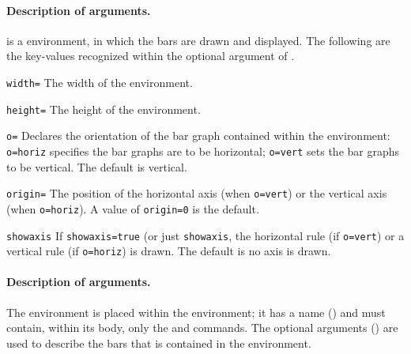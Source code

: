 \documentclass{article}
\begin{document}

\paragraph*{Description of \protect{} arguments.}  is
a  environment, in which the bars are drawn and
displayed. The following are the key-values recognized within the optional
argument of .
\begin{aebDescript}
  \item[\texttt{width=\ameta{length}}] The width of the environment.
  \item[\texttt{height=\ameta{length}}] The height of the environment.
  \item[\texttt{o=\ameta{\upshape{horiz|vert}}}] Declares the orientation of
      the bar graph contained within the environment: \texttt{o=horiz}
      specifies the bar graphs are to be horizontal; \texttt{o=vert} sets the
      bar graphs to be vertical. The default is vertical.
  \item[\texttt{origin=\ameta{\upshape{0|.5}}}] The position of
      the horizontal axis (when \texttt{o=vert}) or the vertical
      axis (when \texttt{o=horiz}). A value of \texttt{origin=0}
      is the default.
  \item[\texttt{showaxis\ameta{\upshape{true|false}}}] If
      \texttt{showaxis=true} (or just \texttt{showaxis}, the horizontal rule
      (if \texttt{o=vert}) or a vertical rule (if \texttt{o=horiz}) is drawn.
      The default is no axis is drawn.

\end{aebDescript}

\paragraph*{Description of \protect{} arguments.} The  environment
is placed within the  environment; it has a name
() and must contain, within its body, only the  and
 commands. The optional arguments () are used to
describe the bars that is contained in the environment.
\end{document}
